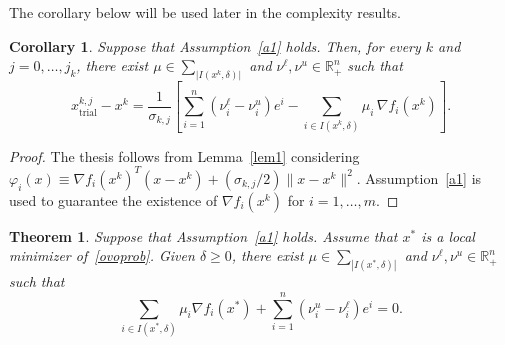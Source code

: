 \documentclass[11pt]{article}
\newcommand{\R}{\mathbb{R}}
\newcommand{\xkjtrial}{x^{k,j}_{\mathrm{trial}}}
\newcommand{\simplex}{\textstyle\sum}
\newtheorem{theorem}{Theorem}[section]
\newtheorem{corollary}{Corollary}[section]
\begin{document}
The corollary below will be used later in the complexity results.

\begin{corollary} \label{coro1}
Suppose that Assumption~\ref{a1} holds. Then, for every $k$ and $j=0,\dots,j_k$, there exist $\mu \in \simplex_{|I(x^k,\delta)|}$ and $\nu^\ell, \nu^u \in \R^n_{+}$ such that
\begin{equation} \label{eqcoro1}
\xkjtrial - x^k = \dfrac{1}{\sigma_{k,j}} \left[ \sum_{i=1}^n \left( \nu^\ell_i - \nu^u_i \right) e^i - \sum_{i \in I(x^k,\delta)} \mu_i \, \nabla f_i(x^k) \right].
\end{equation}
\end{corollary}

\begin{proof}
The thesis follows from Lemma~\ref{lem1} considering $\varphi_i(x) \equiv \nabla f_i(x^k)^T (x-x^k) + (\sigma_{k,j} / 2 ) \| x - x^k \|^2$. Assumption~\ref{a1} is used to guarantee the existence of $\nabla f_i(x^k)$ for $i=1,\dots,m$.
\end{proof}

\begin{theorem} \label{teo4}
Suppose that Assumption~\ref{a1} holds. Assume that $x^*$ is a local minimizer of~\eqref{ovoprob}. Given $\delta \geq 0$, there exist $\mu \in \simplex_{|I(x^*,\delta)|}$ and $\nu^\ell, \nu^u \in \R^n_+$ such that
\begin{equation} \label{eqteo4}
\sum_{i \in I(x^*,\delta)} \mu_i \nabla f_i(x^*) + \sum_{i=1}^n \left( \nu^u_i - \nu^\ell_i \right) e^i = 0.
\end{equation}
\end{theorem}
\end{document}
